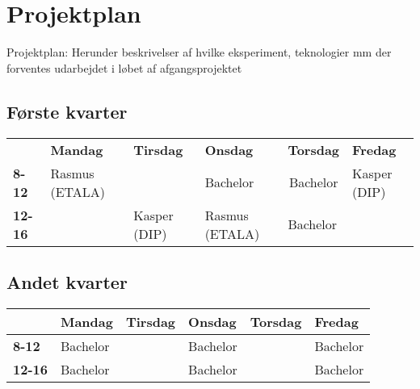 \chapter{Projektplan}
Projektplan: Herunder beskrivelser af hvilke eksperiment, teknologier mm der forventes udarbejdet i løbet af afgangsprojektet
\section{Første kvarter}
\begin{table}[h]
\begin{tabular}{llllll}
               & \textbf{Mandag} & \textbf{Tirsdag} & \textbf{Onsdag} & \textbf{Torsdag}             & \textbf{Fredag} \\
\textbf{8-12}  & Rasmus (ETALA)  &                  & Bachelor        & \multicolumn{1}{c}{Bachelor} & Kasper (DIP)    \\
\textbf{12-16} &                 & Kasper (DIP)     & Rasmus (ETALA)  & Bachelor                     &                
\end{tabular}
\end{table}

\section{Andet kvarter}
\begin{table}[h]
\begin{tabular}{|l|l|l|l|l|l|}
\hline
               & \textbf{Mandag} & \textbf{Tirsdag} & \textbf{Onsdag} & \textbf{Torsdag}       & \textbf{Fredag} \\ \hline
\textbf{8-12}  & Bachelor        &                  & Bachelor        &  					   & Bachelor        \\ \hline
\textbf{12-16} & Bachelor        &                  & Bachelor        &                        & Bachelor        \\ \hline
\end{tabular}
\end{table}